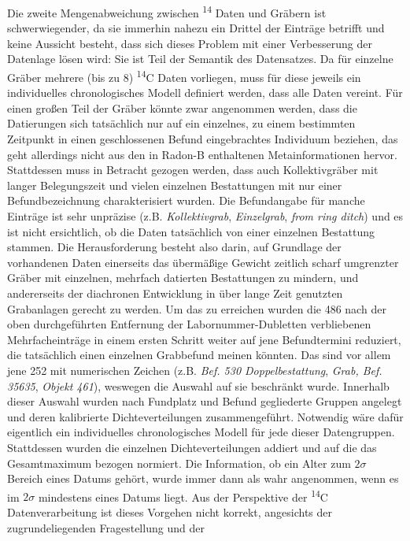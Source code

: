 \documentclass[openany,twoside,twocolumn]{book}
\begin{document}
Die zweite Mengenabweichung zwischen \textsuperscript{14} Daten und
Gräbern ist schwerwiegender, da sie immerhin nahezu ein Drittel der
Einträge betrifft und keine Aussicht besteht, dass sich dieses Problem
mit einer Verbesserung der Datenlage lösen wird: Sie ist Teil der
Semantik des Datensatzes. Da für einzelne Gräber mehrere (bis zu 8)
\textsuperscript{14}C Daten vorliegen, muss für diese jeweils ein
individuelles chronologisches Modell definiert werden, dass alle Daten
vereint. Für einen großen Teil der Gräber könnte zwar angenommen werden,
dass die Datierungen sich tatsächlich nur auf ein einzelnes, zu einem
bestimmten Zeitpunkt in einen geschlossenen Befund eingebrachtes
Individuum beziehen, das geht allerdings nicht aus den in Radon-B
enthaltenen Metainformationen hervor. Stattdessen muss in Betracht
gezogen werden, dass auch Kollektivgräber mit langer Belegungszeit und
vielen einzelnen Bestattungen mit nur einer Befundbezeichnung
charakterisiert wurden. Die Befundangabe für manche Einträge ist sehr
unpräzise (z.B. \emph{Kollektivgrab}, \emph{Einzelgrab}, \emph{from ring
ditch}) und es ist nicht ersichtlich, ob die Daten tatsächlich von einer
einzelnen Bestattung stammen. Die Herausforderung besteht also darin,
auf Grundlage der vorhandenen Daten einerseits das übermäßige Gewicht
zeitlich scharf umgrenzter Gräber mit einzelnen, mehrfach datierten
Bestattungen zu mindern, und andererseits der diachronen Entwicklung in
über lange Zeit genutzten Grabanlagen gerecht zu werden. Um das zu
erreichen wurden die 486 nach der oben durchgeführten Entfernung der
Labornummer-Dubletten verbliebenen Mehrfacheinträge in einem ersten
Schritt weiter auf jene Befundtermini reduziert, die tatsächlich einen
einzelnen Grabbefund meinen könnten. Das sind vor allem jene 252 mit
numerischen Zeichen (z.B. \emph{Bef. 530 Doppelbestattung}, \emph{Grab,
Bef. 35635}, \emph{Objekt 461}), weswegen die Auswahl auf sie beschränkt
wurde. Innerhalb dieser Auswahl wurden nach Fundplatz und Befund
gegliederte Gruppen angelegt und deren kalibrierte Dichteverteilungen
zusammengeführt. Notwendig wäre dafür eigentlich ein individuelles
chronologisches Modell für jede dieser Datengruppen. Stattdessen wurden
die einzelnen Dichteverteilungen addiert und auf die das Gesamtmaximum
bezogen normiert. Die Information, ob ein Alter zum \(2\sigma\) Bereich
eines Datums gehört, wurde immer dann als wahr angenommen, wenn es im
\(2\sigma\) mindestens eines Datums liegt. Aus der Perspektive der
\textsuperscript{14}C Datenverarbeitung ist dieses Vorgehen nicht
korrekt, angesichts der zugrundeliegenden Fragestellung und der
\end{document}
